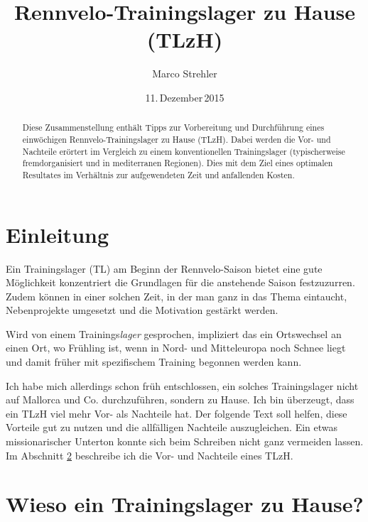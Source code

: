 \documentclass[a4paper,DIV13,BCOR0cm]{scrartcl}
\newcommand{\rv}{Rennvelo}
\newcommand{\tlzh}{TLzH}
\newcommand{\Tlzh}{Trainingslager zu Hause}
\begin{document}
\lhead{\tlzh}

\title{\rv-\Tlzh{} (\tlzh)}
\author{Marco Strehler}

\date{11.\,Dezember\,2015}

\maketitle

\begin{abstract}
Diese Zusammenstellung enthält Tipps zur Vorbereitung und Durchführung eines einwöchigen \rv-Trainingslager zu Hause (\tlzh).
Dabei werden die Vor- und Nachteile erörtert im Vergleich zu einem konventionellen Trainingslager
(typischerweise fremdorganisiert und in mediterranen Regionen). 
Dies mit dem Ziel eines optimalen Resultates im Verhältnis zur aufgewendeten Zeit und anfallenden Kosten.
\end{abstract}

\tableofcontents
\section{Einleitung}

Ein Trainingslager (TL) am Beginn der \rv-Saison bietet eine gute Möglichkeit
konzentriert die Grundlagen für die anstehende Saison festzuzurren.
Zudem können in einer solchen
Zeit, in der man ganz in das Thema eintaucht, Nebenprojekte umgesetzt und die
Motivation gestärkt werden.

Wird von einem Trainings\textsl{lager} gesprochen, impliziert das ein Ortswechsel an einen Ort,
wo Frühling ist, wenn in Nord- und Mitteleuropa noch Schnee liegt und damit früher mit
spezifischem Training begonnen werden kann.

Ich habe mich allerdings schon früh entschlossen, ein solches Trainingslager nicht
auf Mallorca und Co. durchzuführen, sondern zu Hause.
Ich bin überzeugt, dass ein \tlzh{} viel mehr Vor- als Nachteile hat.
Der folgende Text soll helfen, diese Vorteile gut zu nutzen und die allfälligen Nachteile
auszugleichen.
Ein etwas missionarischer Unterton konnte sich beim Schreiben nicht ganz vermeiden lassen.
Im Abschnitt \ref{sec:wiesozuhause} beschreibe ich die Vor- und Nachteile eines \tlzh{}.

\section{Wieso ein Trainingslager zu Hause?}
\label{sec:wiesozuhause}
\end{document}
